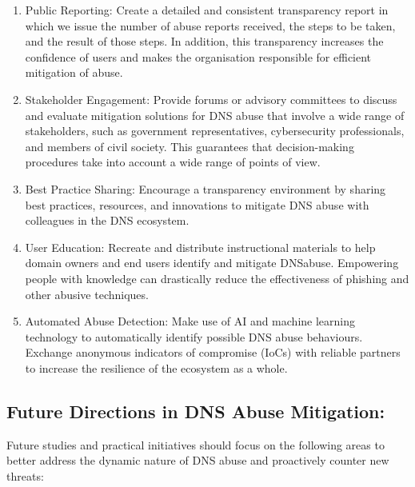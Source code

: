 \begin{enumerate}
    \item Public Reporting: Create a detailed and consistent transparency report in which we issue the number of abuse reports received, the steps to be taken, and the result of those steps. In addition, this transparency increases the confidence of users and makes the organisation responsible for efficient mitigation of abuse.

    \item Stakeholder Engagement: Provide forums or advisory committees to discuss and evaluate mitigation solutions for DNS abuse that involve a wide range of stakeholders, such as government representatives, cybersecurity professionals, and members of civil society. This guarantees that decision-making procedures take into account a wide range of points of view.

    \item Best Practice Sharing: Encourage a transparency environment by sharing best practices, resources, and innovations to mitigate DNS abuse with colleagues in the DNS ecosystem. 

    \item User Education: Recreate and distribute instructional materials to help domain owners and end users identify and mitigate DNSabuse. Empowering people with knowledge can drastically reduce the effectiveness of phishing and other abusive techniques.

    \item Automated Abuse Detection: Make use of AI and machine learning technology to automatically identify possible DNS abuse behaviours. Exchange anonymous indicators of compromise (IoCs) with reliable partners to increase the resilience of the ecosystem as a whole.

\end{enumerate}


\subsection{Future Directions in DNS Abuse Mitigation: }

Future studies and practical initiatives should focus on the following areas to better address the dynamic nature of DNS abuse and proactively counter new threats:

